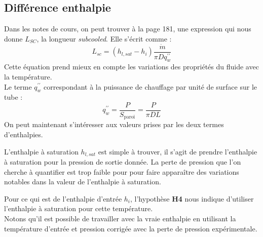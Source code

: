 \subsection{Différence enthalpie}
Dans les notes de cours, on peut trouver à la page 181, une expression qui nous donne $L_{SC}$, la longueur \emph{subcooled}. Elle s'écrit comme :
\begin{equation}
 L_{s c} = \left(h_{l, s a t} - h_{i}\right)\frac{\dot{m}}{\pi D q_{w}^{\prime \prime}} 
\end{equation}
Cette équation prend mieux en compte les variations des propriétés du fluide avec la température.
\\
Le terme $q_{w}^{\prime \prime}$ correspondant à la puissance de chauffage par unité de surface sur le tube :
\begin{equation}
    q_{w}^{\prime \prime} = \frac{P}{S_{\text{paroi}}} = \frac{P}{\pi D L }
\end{equation}
On peut maintenant s'intéresser aux valeurs prises par les deux termes d'enthalpies.\\ \par
L'enthalpie à saturation $h_{l, s a t}$ est simple à trouver, il s'agit de prendre l'enthalpie à saturation pour la pression de sortie donnée. La perte de pression que l'on cherche à quantifier est trop faible pour pour faire apparaître des variations notables dans la valeur de l'enthalpie à saturation.\\ \par
Pour ce qui est de l'enthalpie d'entrée $h_{i}$, l'hypothèse \textbf{H4} nous indique d'utiliser l'enthalpie à saturation pour cette température.\\
Notons qu'il est possible de travailler avec la \og vraie \fg{} enthalpie en utilisant la température d'entrée et pression corrigée avec la perte de pression expérimentale.
